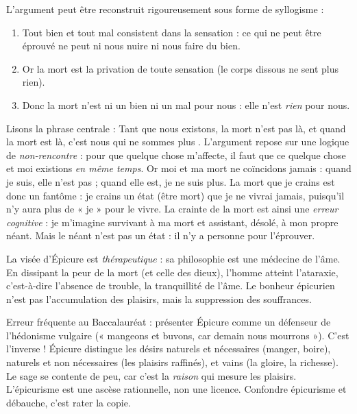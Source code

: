 \documentclass[11pt]{article}
\newcommand{\cle}[1]{{\popxbold\color{popdark}#1}}
\begin{document}
L'argument peut être reconstruit rigoureusement sous forme de syllogisme :

\begin{enumerate}
\item Tout bien et tout mal consistent dans la sensation : ce qui ne peut être éprouvé ne peut ni nous nuire ni nous faire du bien.
\item Or la mort est la privation de toute sensation (le corps dissous ne sent plus rien).
\item Donc la mort n'est ni un bien ni un mal pour nous : elle n'est \emph{rien} pour nous.
\end{enumerate}

\begin{experience}
Lisons la phrase centrale : \guillemotleft Tant que nous existons, la mort n'est pas là, et quand la mort est là, c'est nous qui ne sommes plus \guillemotright. L'argument repose sur une logique de \emph{non-rencontre} : pour que quelque chose m'affecte, il faut que ce quelque chose et moi existions \emph{en même temps}. Or moi et ma mort ne coïncidons jamais : quand je suis, elle n'est pas ; quand elle est, je ne suis plus. La mort que je crains est donc un fantôme : je crains un état (être mort) que je ne vivrai jamais, puisqu'il n'y aura plus de « je » pour le vivre. La crainte de la mort est ainsi une \emph{erreur cognitive} : je m'imagine survivant à ma mort et assistant, désolé, à mon propre néant. Mais le néant n'est pas un état : il n'y a personne pour l'éprouver.
\end{experience}

La visée d'Épicure est \emph{thérapeutique} : sa philosophie est une médecine de l'âme. En dissipant la peur de la mort (et celle des dieux), l'homme atteint l'\cle{ataraxie}, c'est-à-dire l'absence de trouble, la tranquillité de l'âme. Le bonheur épicurien n'est pas l'accumulation des plaisirs, mais la suppression des souffrances.

\begin{attention}
Erreur fréquente au Baccalauréat : présenter Épicure comme un défenseur de l'hédonisme vulgaire (« mangeons et buvons, car demain nous mourrons »). C'est l'inverse ! Épicure distingue les désirs naturels et nécessaires (manger, boire), naturels et non nécessaires (les plaisirs raffinés), et vains (la gloire, la richesse). Le sage se contente de peu, car c'est la \emph{raison} qui mesure les plaisirs. L'épicurisme est une ascèse rationnelle, non une licence. Confondre épicurisme et débauche, c'est rater la copie.
\end{attention}
\end{document}
